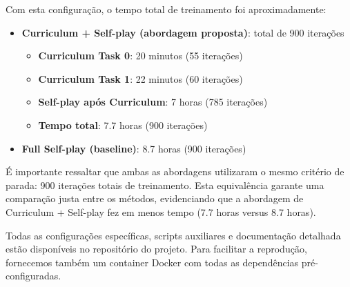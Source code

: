 Com esta configuração, o tempo total de treinamento foi aproximadamente:

\begin{itemize}
    \item \textbf{Curriculum + Self-play (abordagem proposta)}: total de 900 iterações
    \begin{itemize}
        \item \textbf{Curriculum Task 0}: 20 minutos (55 iterações)
        \item \textbf{Curriculum Task 1}: 22 minutos (60 iterações)
        \item \textbf{Self-play após Curriculum}: 7 horas (785 iterações)
        \item \textbf{Tempo total}: 7.7 horas (900 iterações)
    \end{itemize}
    \item \textbf{Full Self-play (baseline)}: 8.7 horas (900 iterações)
\end{itemize}

É importante ressaltar que ambas as abordagens utilizaram o mesmo critério de parada: 900 iterações totais de treinamento. Esta equivalência garante uma comparação justa entre os métodos, evidenciando que a abordagem de Curriculum + Self-play fez em menos tempo (7.7 horas versus 8.7 horas).

Todas as configurações específicas, scripts auxiliares e documentação detalhada estão disponíveis no repositório do projeto. Para facilitar a reprodução, fornecemos também um container Docker com todas as dependências pré-configuradas.
